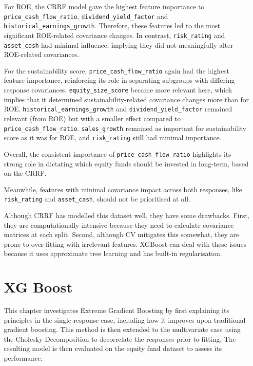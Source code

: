 \documentclass[11pt]{report} %
\begin{document}
\noindent For ROE, the CRRF model gave the highest feature importance to \texttt{price\_cash\_flow\_ratio}, \texttt{dividend\linebreak\_yield\_factor} and \texttt{historical\_earnings\_growth}. Therefore, these features led to the most significant ROE-related covariance changes.  In contrast, \texttt{risk\_rating} and \texttt{asset\_cash} had minimal influence, implying they did not meaningfully alter ROE-related covariances.

For the sustainability score, \texttt{price\_cash\_flow\_ratio} again had the highest feature importance, reinforcing its role in separating subgroups with differing response covariances. \texttt{equity\_size\_score} became more relevant here, which implies that it determined sustainability-related covariance changes more than for ROE. \texttt{historical\_earnings\_growth} and \texttt{dividend\_yield\_factor} remained relevant (from ROE) but with a smaller effect compared to \texttt{price\_cash\_flow\_ratio}. \texttt{sales\_growth} remained as important for sustainability score as it was for ROE, and \texttt{risk\_rating} still had minimal importance.

Overall, the consistent importance of \texttt{price\_cash\_flow\_ratio} highlights its strong role in dictating which equity funds should be invested in long-term, based on the CRRF. 

Meanwhile, features with minimal covariance impact across both responses, like \texttt{risk\_rating} and \texttt{asset\_cash}, should not be prioritised at all. 

Although CRRF has modelled this dataset well, they have some drawbacks. First, they are computationally intensive because they need to calculate covariance matrices at each split. Second, although CV mitigates this somewhat, they are prone to over-fitting with irrelevant features. XGBoost can deal with these issues because it uses approximate tree learning and has built-in regularisation.

\chapter{XG Boost}
\label{xgboost}
This chapter investigates Extreme Gradient Boosting by first explaining its principles in the single-response case, including how it improves upon traditional gradient boosting. %
This method is then extended to the multivariate case using the Cholesky Decomposition to decorrelate the responses prior to fitting. The resulting model is then evaluated on the equity fund dataset to assess its performance.
\end{document}
